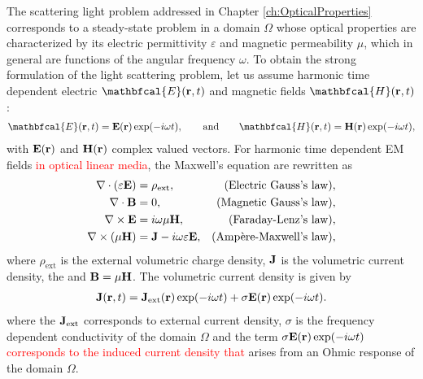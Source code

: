
The scattering light problem addressed in Chapter \ref{ch:OpticalProperties} corresponds to a steady-state problem in a domain $\Omega$ whose optical properties are characterized by its electric permittivity $\varepsilon$ and magnetic permeability $\mu$, which in general are functions of the angular frequency $\omega$. To obtain the strong formulation of the light scattering problem, let us assume harmonic time dependent electric $\mathbfcal{E}(\vb{r},t)$ and magnetic fields $\mathbfcal{H}(\vb{r},t)$:
%
\begin{align}
    \mathbfcal{E}(\vb{r},t) = \vb{E}(\vb{r})\exp(-i\omega t),
        \qquad
        \text{and}
        \qquad
    \mathbfcal{H}(\vb{r},t) =  \vb{H}(\vb{r}) \exp(-i\omega t),
\end{align}
%
with $ \vb{E}(\vb{r})$ and $ \vb{H}(\vb{r})$ complex valued vectors. For harmonic time dependent EM fields \textcolor{red}{in optical linear media}, the Maxwell's equation are rewritten as \cite{jackson_classical_1999}
%
%
%
\begin{subequations}
    \label{eq:MaxwellsEq}
\begin{align}
    \nabla \cdot \qty(\varepsilon \vb{E})  &= \rho_\text{ext},  &\mbox{(Electric Gauss's law)},\\
    \nabla \cdot   \vb{B} &= 0, & \mbox{(Magnetic Gauss's law)},
            \label{eq:GaussM}\\
    \nabla \times \vb{E}  &= i\omega \mu \vb{H},  &  \mbox{(Faraday-Lenz's law)},\\
    \nabla \times \qty(\mu \vb{H})  &= \vb{J} - i\omega \varepsilon \vb{E}, & \mbox{(Ampère-Maxwell's law)},
\end{align}
\end{subequations}
%
where  $\rho_\text{ext}$ is the external volumetric charge density, $\vb{J}$ is the volumetric current density, the  and  $\vb{B} = \mu \vb{H}$. The volumetric current density is given by \cite{jackson_classical_1999}
%
\begin{align}
    \vb{J}(\vb{r},t) = \vb{J}_\text{ext}(\vb{r})\exp(-i\omega t) + \sigma \vb{E}(\vb{r})\exp(-i\omega t).
    \label{eq:ohmic}
\end{align}
%
where the $\vb{J}_\text{ext}$ corresponds to external current density, $\sigma$ is the frequency dependent conductivity of the domain $\Omega$ and the term $\sigma \vb{E}(\vb{r})\exp(-i\omega t)$ \textcolor{red}{corresponds to the induced current density that} arises from an Ohmic response of the domain $\Omega$.

